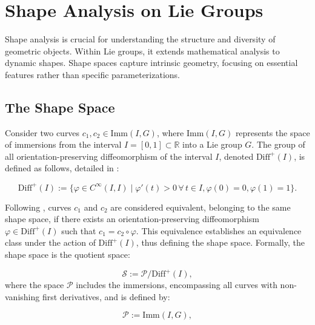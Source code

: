\section{Shape Analysis on Lie Groups}
\label{sec:shape-analysis-on-Lie-groups}

Shape analysis is crucial for understanding the structure and diversity of geometric objects. Within Lie groups, it extends mathematical analysis to dynamic shapes. Shape spaces capture intrinsic geometry, focusing on essential features rather than specific parameterizations.

\newpage
\subsection{The Shape Space}
\label{subsec:shape-space}

Consider two curves \(c_1, c_2 \in \mathrm{Imm}(I, G)\), where \(\mathrm{Imm}(I, G)\) represents the space of immersions from the interval \(I = [0,1] \subset \mathbb{R}\) into a Lie group \(G\). The group of all orientation-preserving diffeomorphism of the interval \(I\), denoted \(\mathrm{Diff}^+(I)\), is defined as follows, detailed in \cite{celledoniSignaturesShapeAnalysis2019}:

\begin{equation}
    \mathrm{Diff}^+(I) := \{\varphi \in C^\infty(I, I) \mid \varphi'(t) > 0 \, \forall \, t \in I, \varphi(0) = 0, \varphi(1) = 1\}.
    \label{eq:diffeomorphism-group}
\end{equation}

Following \cite{celledoniShapeAnalysisLie2016}, curves \(c_1\) and \(c_2\) are considered equivalent, belonging to the same shape space, if there exists an orientation-preserving diffeomorphism \(\varphi \in \mathrm{Diff}^+(I)\) such that \(c_1 = c_2 \circ \varphi\). This equivalence establishes an equivalence class under the action of \(\mathrm{Diff}^+(I)\), thus defining the shape space. Formally, the shape space is the quotient space:

\begin{equation}
    \mathcal{S} := \mathcal{P} / \mathrm{Diff}^+(I),
    \label{eq:shape-space}
\end{equation}
where the space \(\mathcal{P}\) includes the immersions, encompassing all curves with non-vanishing first derivatives, and is defined by:

\begin{equation}
    \mathcal{P} := \mathrm{Imm}(I, G),
    \label{eq:parameterized-space}
\end{equation}

